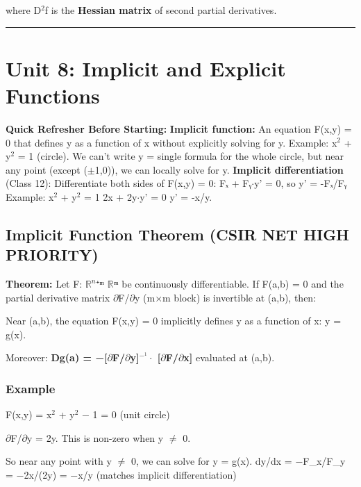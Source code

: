 \documentclass[12pt,a4paper,openany]{book}
\begin{document}
{{where D$^2$f is the \textbf{Hessian matrix} of second partial derivatives.

\bigskip\noindent\rule{\textwidth}{0.4pt}\bigskip

\section{Unit 8: Implicit and Explicit Functions}

\begin{prereqbox}
 \textbf{Quick Refresher Before Starting:}
\textbf{Implicit function:} An equation F(x,y) = 0 that defines y as a function of x without explicitly solving for y.
Example: x$^2$ + y$^2$ = 1 (circle). We can't write y = single formula for the whole circle, but near any point (except ($\pm$1,0)), we can locally solve for y.
\textbf{Implicit differentiation} (Class 12): Differentiate both sides of F(x,y) = 0:
Fₓ + Fᵧ$\cdot$y' = 0, so y' = -Fₓ/Fᵧ
Example: x$^2$ + y$^2$ = 1  2x + 2y$\cdot$y' = 0  y' = -x/y.
\end{prereqbox}


\subsection{Implicit Function Theorem  (CSIR NET HIGH PRIORITY)}

\begin{tcolorbox}[colback=lightblue,colframe=thmblue,title=\textbf{Theorem},breakable,boxrule=1.5pt]
\textbf{Theorem:} Let F: $\mathbb{R}^n$⁺ᵐ  $\mathbb{R}$ᵐ be continuously differentiable. If F(a,b) = 0 and the partial derivative matrix $\partial$F/$\partial$y (m$\times$m block) is invertible at (a,b), then:
\end{tcolorbox}

Near (a,b), the equation F(x,y) = 0 implicitly defines y as a function of x: y = g(x).

Moreover: \textbf{Dg(a) = −[$\partial$F/$\partial$y]$^{-}^1\cdot$ [$\partial$F/$\partial$x]} evaluated at (a,b).

\subsubsection{Example}
F(x,y) = x$^2$ + y$^2$ − 1 = 0 (unit circle)

$\partial$F/$\partial$y = 2y. This is non-zero when y $\neq$ 0.

So near any point with y $\neq$ 0, we can solve for y = g(x).
dy/dx = −F_x/F_y = −2x/(2y) = −x/y  (matches implicit differentiation)

}}
\end{document}
